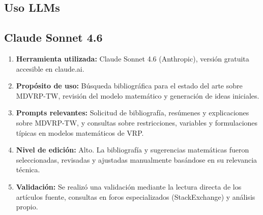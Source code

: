 \documentclass[letter, 10pt, dvipdfmx]{article}
\begin{document}
\begin{small}
\section{Uso LLMs}


\subsection{Claude Sonnet 4.6}
\begin{enumerate}
  \item \textbf{Herramienta utilizada:} Claude Sonnet 4.6 (Anthropic), versión gratuita accesible en claude.ai.
  \item \textbf{Propósito de uso:} Búsqueda bibliográfica para el estado del arte sobre MDVRP-TW, revisión del modelo matemático y generación de ideas iniciales.
  \item \textbf{Prompts relevantes:} Solicitud de bibliografía, resúmenes y explicaciones sobre MDVRP-TW, y consultas sobre restricciones, variables y formulaciones típicas en modelos matemáticos de VRP.
  \item \textbf{Nivel de edición:} Alto. La bibliografía y sugerencias matemáticas fueron seleccionadas, revisadas y ajustadas manualmente basándose en su relevancia técnica.
  \item \textbf{Validación:} Se realizó una validación mediante la lectura directa de los artículos fuente, consultas en foros especializados (StackExchange) y análisis propio.
\end{enumerate}


\end{small}
\end{document}
